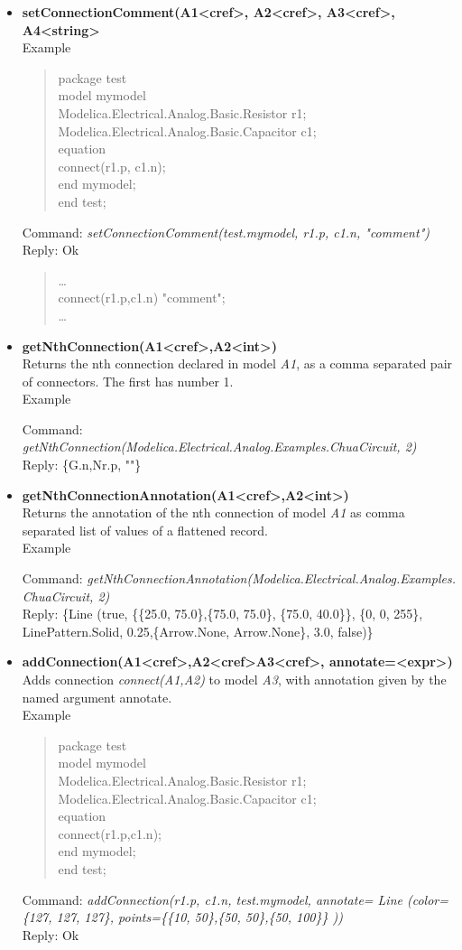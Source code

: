 \documentclass[11pt,a4paper,oneside,english]{book}
\newenvironment{modelicaExamples}{\begin{itemize}}{\end{itemize}}
\newcommand{\api}[2]{\item \textbf{#1} \\ #2}
\newcommand{\tab}{\hspace{2em}}
\newcommand{\command}[1]{Command: \textit{#1}\\}
\newcommand{\reply}[1]{Reply: #1}
\newcommand{\functionex}[2]{\begin{singlespace} \command{#1} \reply{#2} \end{singlespace}}
\newcommand{\examples}{Example}
\newenvironment{mocode}{\begin{verse}\begin{singlespace}\begin{scriptsize}\ttfamily}{\end{scriptsize}\end{singlespace}\end{verse}}
\begin{document}
\begin{modelicaExamples}
		\api{setConnectionComment(A1<cref>, A2<cref>, A3<cref>, A4<string>}{
		\examples
		\begin{mocode}
		package test\\
		\tab model mymodel\\
		\tab\tab Modelica.Electrical.Analog.Basic.Resistor r1;\\
		\tab\tab Modelica.Electrical.Analog.Basic.Capacitor c1;\\
		\tab equation\\
		\tab\tab connect(r1.p, c1.n);\\
		\tab end mymodel;\\
		end test;\\
		\end{mocode}
		\functionex{setConnectionComment(test.mymodel, r1.p, c1.n, "comment")}
		{Ok}
		
		\begin{mocode}
		\dots \\
		connect(r1.p,c1.n) "comment";\\
		\dots \\
		\end{mocode}
		}
		
		\api{getNthConnection(A1<cref>,A2<int>)}{Returns the nth connection declared in model \textit{A1}, as a comma separated pair of connectors. The first has number 1.\\
		\examples
		\functionex{getNthConnection(Modelica.Electrical.Analog.Examples.ChuaCircuit, 2)}
		{\{G.n,Nr.p, ""\}}
		}
		\api{getNthConnectionAnnotation(A1<cref>,A2<int>)}{Returns the annotation of the nth connection of model \textit{A1} as comma separated list of values of a flattened record.\\
		\examples
		\functionex{getNthConnectionAnnotation(Modelica.Electrical.Analog.Examples. ChuaCircuit, 2)}
		{\{Line (true, \{\{25.0, 75.0\},\{75.0, 75.0\}, \{75.0, 40.0\}\}, \{0, 0, 255\}, LinePattern.Solid, 0.25,\{Arrow.None, Arrow.None\}, 3.0, false)\}}
		
		}
		
		\api{addConnection(A1<cref>,A2<cref>A3<cref>, annotate=<expr>)}{Adds connection \textit{connect(A1,A2)} to model \textit{A3}, with annotation given by the named argument annotate.\\
		\examples
		\begin{mocode}
		package test\\
		\tab model mymodel\\
		\tab\tab Modelica.Electrical.Analog.Basic.Resistor r1;\\
		\tab\tab Modelica.Electrical.Analog.Basic.Capacitor c1;\\
		\tab equation \\
		\tab\tab connect(r1.p,c1.n);\\
		\tab end mymodel;\\
		end test;\\
		\end{mocode}
		\functionex{addConnection(r1.p, c1.n, test.mymodel, annotate= Li\-ne (co\-lor= \{127, 127, 127\}, points=\{\{10, 50\},\{50, 50\},\{50, 100\}\} ))}
		{Ok}
		
}
\end{modelicaExamples}
\end{document}
